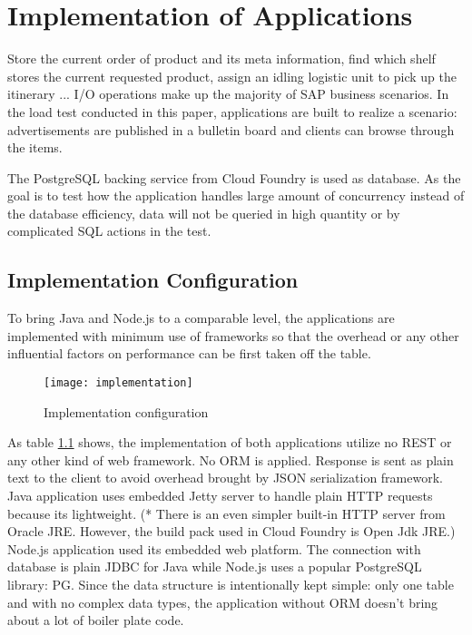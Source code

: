 \chapter{Implementation of Applications}
Store the current order of product and its meta information, find which shelf stores the current requested product, assign an idling logistic unit to pick up the itinerary ... I/O operations make up the majority of SAP business scenarios. 
 In the load test conducted in this paper, applications are built to realize a scenario: advertisements are published in a bulletin board and clients can browse through the items. 

The PostgreSQL backing service from Cloud Foundry is used as database. As the goal is to test how the application handles large amount of concurrency instead of the database efficiency, data will not be queried in high quantity or by complicated SQL actions in the test. 

\section{Implementation Configuration}
To bring Java and Node.js to a comparable level, the applications are implemented with minimum use of frameworks so that the overhead or any other influential factors on performance can be first taken off the table.

 \begin{figure}[h]
 	\centering
 	\texttt{[image: implementation]}
 	\caption{Implementation configuration}
 	\label{implementation}
 \end{figure}

As table \ref{implementation} shows,  the implementation of both applications utilize no REST or any other kind of web framework. No ORM is applied. Response is sent as plain text to the client to avoid overhead brought by JSON serialization framework. \\
Java application uses embedded Jetty server to handle plain HTTP requests because its lightweight. (* There is an even simpler built-in HTTP server from Oracle JRE. However, the build pack used in Cloud Foundry is Open Jdk JRE.)  Node.js application used its embedded web platform. The connection with database is plain JDBC for Java while Node.js uses a popular PostgreSQL library: PG. Since the data structure is intentionally kept simple: only one table and with no complex data types, the application without ORM doesn't bring about a lot of boiler plate code.  \\

